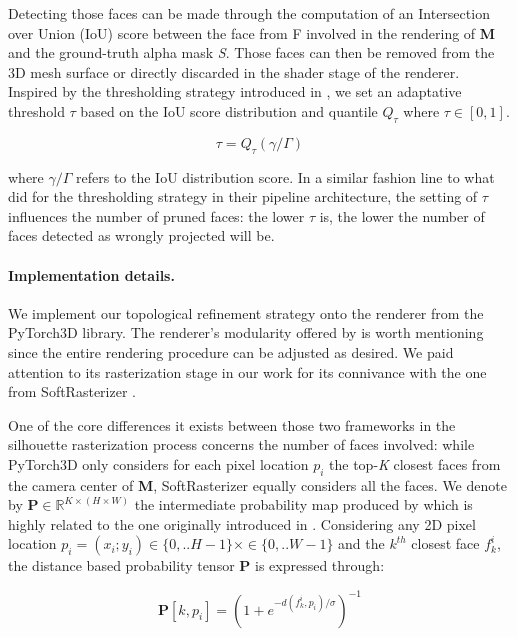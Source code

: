 Detecting those faces can be made through the computation of an Intersection over Union (IoU) score between the face from F involved in the rendering of \textbf{M} and the ground-truth alpha mask \textit{S}. Those faces can then be removed from the 3D mesh surface or directly discarded in the shader stage of the renderer. Inspired by the thresholding strategy introduced in \citep{pan2019deep}, we set an adaptative threshold $\tau$ based on the IoU score distribution and quantile $Q_{\tau}$ where $\tau \in [0,1]$.

\begin{equation}
    \tau=Q_{\tau}({\gamma/\Gamma})
\end{equation}

where ${\gamma/\Gamma}$ refers to the IoU distribution score. 
In a similar fashion line to what \citep{pan2019deep} did for the thresholding strategy in their pipeline architecture, the setting of $\tau$ influences the number of pruned faces: the lower $\tau$ is, the lower the number of faces detected as wrongly projected will be.

\paragraph{Implementation details.}
We implement our topological refinement strategy onto the renderer from the PyTorch3D \citep{ravi2020accelarating} library. The renderer's modularity offered by \citep{ravi2020accelarating} is worth mentioning since the entire rendering procedure can be adjusted as desired. We paid attention to its rasterization stage in our work for its connivance with the one from SoftRasterizer \citep{liu2019soft}. 

One of the core differences it exists between those two frameworks in the silhouette rasterization process concerns the number of faces involved: while PyTorch3D only considers for each pixel location $p_i$ the top-\textit{K} closest faces from the camera center of \textbf{M}, SoftRasterizer equally considers all the faces. 
We denote by $\mathbf{P}\in \mathbb{R}^{K\times(H\times W)}$ the intermediate probability map produced by \citep{ravi2020accelarating} which is highly related to the one originally introduced in \citep{liu2019soft}. Considering any 2D pixel location $p_{i}=(x_{i};y_{i}) \in \{0,..H-1\}\times\in \{0,..W-1\} $ and the $k^{th}$ closest face $f_{k}^{i}$, the distance based probability tensor $\mathbf{P}$ is expressed through:

\begin{equation}
    \mathbf{P}[k,p_{i}]=\left(1+e^{-d(f_{k}^{i},p_{i})/\sigma}\right)^{-1} 
\end{equation}

